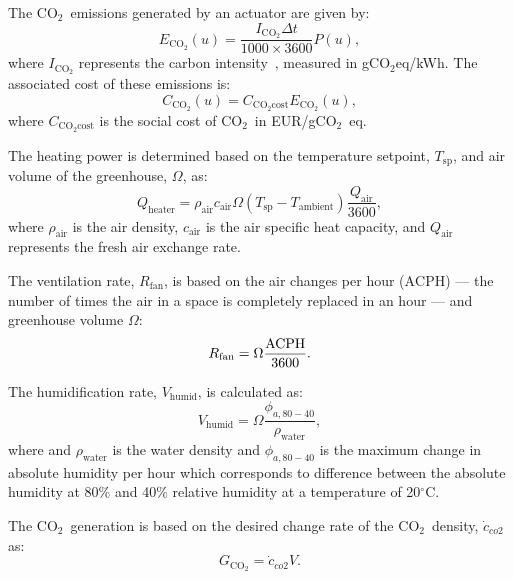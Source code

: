 \documentclass[conference]{IEEEtran}
\newcommand{\coo}{\ensuremath{\mathrm{CO_2}}}
\begin{document}
The \coo\ emissions generated by an actuator are given by:
\begin{equation}
    E_{\coo}(u) = \frac{I_{\coo}  \Delta t}{1000 \times 3600}  P(u),
\end{equation}
where \( I_{\coo} \) represents the carbon intensity~\cite{ElectricityMaps2022}, measured in g\coo{}eq/kWh. The associated cost of these emissions is:
\begin{equation}
    C_{\coo}(u) = C_{\coo\text{cost}}  E_{\coo}(u),
\end{equation}
where \( C_{\coo\text{cost}} \) is the social cost of \coo\ in EUR/g\coo\ eq.

The heating power is determined based on the temperature setpoint, \( T_{\text{sp}} \), and air volume of the greenhouse, \( \Omega \), as:
\begin{equation}
    Q_{\text{heater}} = \rho_{\text{air}}  c_{\text{air}}  \Omega  (T_{\text{sp}} - T_{\text{ambient}})  \frac{Q_{\text{air}}}{3600},
\end{equation}
where \( \rho_{\text{air}} \) is the air density, \( c_{\text{air}} \) is the air specific heat capacity, and \( Q_{\text{air}} \) represents the fresh air exchange rate.

The ventilation rate, \( R_{\text{fan}} \), is based on the air changes per hour (\( \text{ACPH} \)) --- the number of times the air in a space is completely replaced in an hour --- and greenhouse volume \( \Omega \):
\begin{equation}
    R_{\text{fan}} = \Omega \frac{\text{\( \text{ACPH} \)}}{3600}.
\end{equation}

The humidification rate, \( V_{\text{humid}} \), is calculated as:
\begin{equation}
    V_{\text{humid}} = \Omega \frac{\phi_{a, 80 - 40}}{\rho_{\text{water}}},
\end{equation}
where and \( \rho_{\text{water}} \) is the water density and  \( \phi_{a, 80 - 40} \) is the maximum change in absolute humidity per hour which corresponds to difference between the absolute humidity at 80\% and 40\% relative humidity at a temperature of 20\( ^\circ \)C.

The \coo\ generation is based on the desired change rate of the \coo\ density, \( \dot{c}_{co2} \) as:
\begin{equation}
    G_{\coo} = \dot{c}_{co2}  V.
\end{equation}
\end{document}
